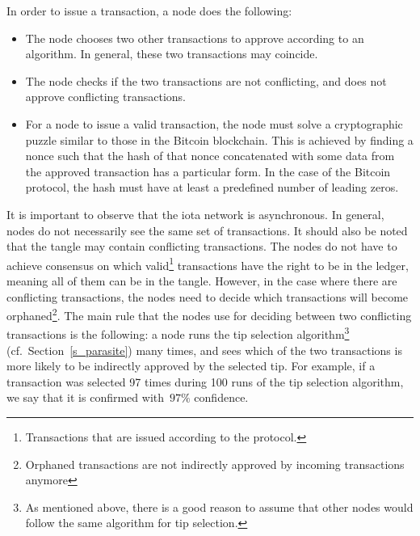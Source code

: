 \documentclass[12pt]{article}
\begin{document}
In order to issue a transaction, a node
does the following:
\begin{itemize}
 \item 
 The node chooses two other transactions to approve
according to an algorithm. In general, these two
transactions may coincide.
 \item 
 The node checks if the two transactions
are not conflicting, and does not approve
conflicting transactions.
 \item For
 a node to issue a valid transaction,
the node must solve a cryptographic puzzle 
 similar to those in the Bitcoin blockchain.
 This is achieved by finding a nonce such that the hash
 of that nonce concatenated with some data from the 
 approved transaction has a particular form. In the case
 of the Bitcoin protocol, the hash must have at least a 
 predefined number of leading zeros.
\end{itemize}
It is important to observe that
the iota network is asynchronous.
In general,
nodes do not necessarily see the same set of transactions.
It should also be noted 
that the tangle may
contain conflicting transactions.
The nodes do not have to achieve consensus on 
which valid\footnote{Transactions that are issued 
according to the protocol.
} transactions
have the right
to be in the ledger,
meaning all of them can be in the tangle.
However, in the case where there are conflicting transactions,
the nodes need to decide which transactions will become
orphaned\footnote{Orphaned transactions are not indirectly
approved by incoming transactions anymore}.
The main rule that the nodes use for deciding 
between two conflicting transactions 
is the following: 
a node runs the tip selection algorithm\footnote{As mentioned above,
there is a good reason to assume that other nodes would
follow 
the same algorithm for tip selection.} 
(cf.\ Section~\ref{s_parasite}) many times,
and sees which of the two transactions 
is more likely to be indirectly
approved by the selected tip. For example,
if
a transaction was selected 97 times during 100 runs
of the tip selection algorithm,
we say that it is confirmed with~$97\%$ confidence.
\end{document}
